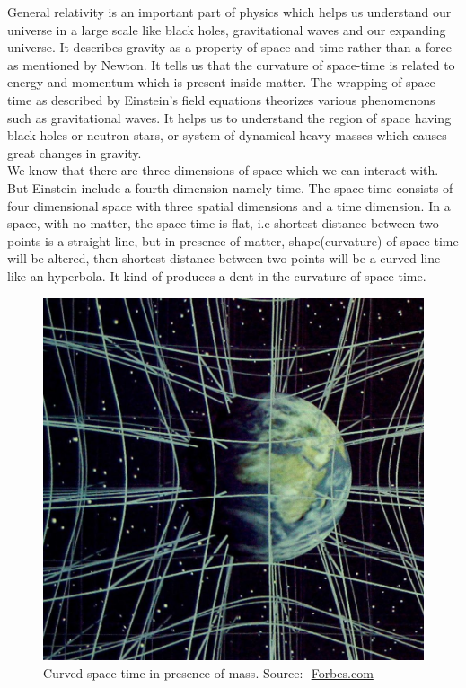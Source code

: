 \hspace{0.5cm} General relativity is an important part of physics which helps us understand our universe in a large scale like black holes, gravitational waves and our expanding universe. It describes gravity as a property of space and time rather than a force as mentioned by Newton. It tells us that the curvature of space-time is related to energy and momentum which is present inside matter. The wrapping of space-time as described by Einstein's field equations theorizes various phenomenons such as gravitational waves. It helps us to understand the region of space having black holes or neutron stars, or system of dynamical heavy masses which causes great changes in gravity.\\ We know that there are three dimensions of space which we can interact with. But Einstein include a fourth dimension namely time. The space-time consists of four dimensional space with three spatial dimensions and a time dimension. In a space, with no matter, the space-time is flat, i.e shortest distance between two points is a straight line, but in presence of matter, shape(curvature) of space-time will be altered, then shortest distance between two points will be a curved line like an hyperbola. It kind of produces a dent in the curvature of space-time. 

\begin{figure}[h]
    \centering
    \includegraphics[scale=0.2]{gw-physics-and-ligo/images.tex/illus_3dspace1.jpg}
    \caption{Curved space-time in presence of mass. Source:- \href{https://www.forbes.com/sites/startswithabang/2019/02/16/ask-ethan-how-can-we-measure-the-curvature-of-gravity/?sh=13c20ec1134f}{Forbes.com}}
\end{figure}

